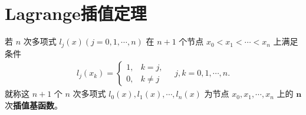 \documentclass[../../main.tex]{subfiles}
\begin{document}
\section{Lagrange插值定理}

\begin{definition}[插值基函数]
若 $n$ 次多项式 $l_j(x) (j = 0, 1, \cdots, n)$ 在 $n + 1$ 个节点 $x_0 < x_1 < \cdots < x_n$ 上满足条件 
\begin{align*}
l_j(x_k) = \begin{cases} 
1, & k = j, \\ 
0, & k \neq j 
\end{cases} \quad j, k = 0, 1, \cdots, n.
\end{align*}
就称这 $n + 1$ 个 $n$ 次多项式 $l_0(x), l_1(x), \cdots, l_n(x)$ 为节点 $x_0, x_1, \cdots, x_n$ 上的 $\boldsymbol{n}$ 次\textbf{插值基函数}。
\end{definition}
\end{document}
